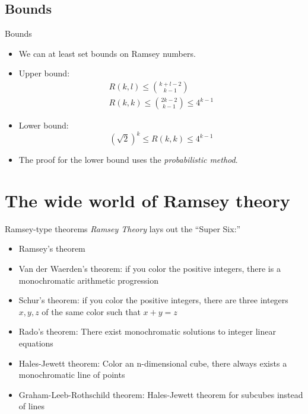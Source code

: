 \documentclass[aspectratio=169]{beamer}
\begin{document}
\subsection{Bounds} %
\begin{frame}{Bounds}
\begin{itemize}
    \item We can at least set bounds on Ramsey numbers. \pause
    \item  Upper bound: \cite[13.6, 13.7]{Bona06}
    \begin{gather*}
        R(k, l) \leq {k+l-2 \choose k-1} \\
        R(k, k) \leq {2k - 2 \choose k -1} \leq 4^{k-1}
    \end{gather*} \pause
    \item  Lower bound: \cite[15.5]{Bona06}
    \[
    (\sqrt{2})^k \leq R(k,k) \leq 4^{k-1}
    \]
    \item The proof for the lower bound uses the \textcolor{sigma@mainblue}{\emph{probabilistic method}}.
\end{itemize}
\end{frame}

\section{The wide world of Ramsey theory}
\frame{\sectionpage}

\begin{frame}{Ramsey-type theorems}
    \textit{Ramsey Theory}\cite[1.3]{Graham} lays out the ``Super Six:''
    \begin{itemize}
        \item Ramsey's theorem \pause
        \item Van der Waerden's theorem: if you color the positive integers, there is a monochromatic arithmetic progression \pause
        \item Schur's theorem: if you color the positive integers, there are three integers $x,y,z$ of the same color such that $x + y = z$ \pause
        \item Rado's theorem: There exist monochromatic solutions to integer linear equations \pause
        \item Hales-Jewett theorem: Color an n-dimensional cube, there always exists a monochromatic line of points \pause
        \item Graham-Leeb-Rothschild theorem: Hales-Jewett theorem for subcubes instead of lines
    \end{itemize}
\end{frame}
\end{document}
